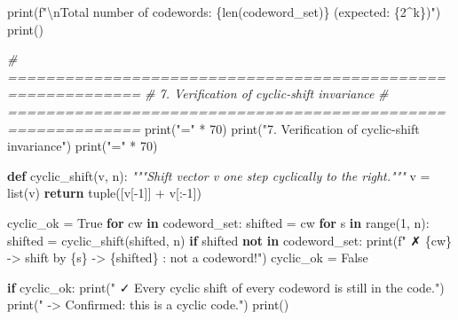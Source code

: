 \documentclass[
]{article}
\newenvironment{Shaded}{}{}
\newcommand{\BuiltInTok}[1]{\textcolor[rgb]{0.00,0.50,0.00}{#1}}
\newcommand{\CharTok}[1]{\textcolor[rgb]{0.25,0.44,0.63}{#1}}
\newcommand{\CommentTok}[1]{\textcolor[rgb]{0.38,0.63,0.69}{\textit{#1}}}
\newcommand{\ControlFlowTok}[1]{\textcolor[rgb]{0.00,0.44,0.13}{\textbf{#1}}}
\newcommand{\DecValTok}[1]{\textcolor[rgb]{0.25,0.63,0.44}{#1}}
\newcommand{\KeywordTok}[1]{\textcolor[rgb]{0.00,0.44,0.13}{\textbf{#1}}}
\newcommand{\NormalTok}[1]{#1}
\newcommand{\OperatorTok}[1]{\textcolor[rgb]{0.40,0.40,0.40}{#1}}
\newcommand{\SpecialCharTok}[1]{\textcolor[rgb]{0.25,0.44,0.63}{#1}}
\newcommand{\SpecialStringTok}[1]{\textcolor[rgb]{0.73,0.40,0.53}{#1}}
\newcommand{\StringTok}[1]{\textcolor[rgb]{0.25,0.44,0.63}{#1}}
\newcommand{\VariableTok}[1]{\textcolor[rgb]{0.10,0.09,0.49}{#1}}
\begin{document}
\begin{Shaded}
\begin{Highlighting}[]
\BuiltInTok{print}\NormalTok{(}\SpecialStringTok{f"}\CharTok{\textbackslash{}n}\SpecialStringTok{Total number of codewords: }\SpecialCharTok{\{}\BuiltInTok{len}\NormalTok{(codeword\_set)}\SpecialCharTok{\}}\SpecialStringTok{ (expected: }\SpecialCharTok{\{}\DecValTok{2}\OperatorTok{\^{}}\NormalTok{k}\SpecialCharTok{\}}\SpecialStringTok{)"}\NormalTok{)}
\BuiltInTok{print}\NormalTok{()}

\CommentTok{\# ============================================================}
\CommentTok{\# 7. Verification of cyclic{-}shift invariance}
\CommentTok{\# ============================================================}
\BuiltInTok{print}\NormalTok{(}\StringTok{"="} \OperatorTok{*} \DecValTok{70}\NormalTok{)}
\BuiltInTok{print}\NormalTok{(}\StringTok{"7. Verification of cyclic{-}shift invariance"}\NormalTok{)}
\BuiltInTok{print}\NormalTok{(}\StringTok{"="} \OperatorTok{*} \DecValTok{70}\NormalTok{)}

\KeywordTok{def}\NormalTok{ cyclic\_shift(v, n):}
    \CommentTok{"""Shift vector v one step cyclically to the right."""}
\NormalTok{    v }\OperatorTok{=} \BuiltInTok{list}\NormalTok{(v)}
    \ControlFlowTok{return} \BuiltInTok{tuple}\NormalTok{([v[}\OperatorTok{{-}}\DecValTok{1}\NormalTok{]] }\OperatorTok{+}\NormalTok{ v[:}\OperatorTok{{-}}\DecValTok{1}\NormalTok{])}

\NormalTok{cyclic\_ok }\OperatorTok{=} \VariableTok{True}
\ControlFlowTok{for}\NormalTok{ cw }\KeywordTok{in}\NormalTok{ codeword\_set:}
\NormalTok{    shifted }\OperatorTok{=}\NormalTok{ cw}
    \ControlFlowTok{for}\NormalTok{ s }\KeywordTok{in} \BuiltInTok{range}\NormalTok{(}\DecValTok{1}\NormalTok{, n):}
\NormalTok{        shifted }\OperatorTok{=}\NormalTok{ cyclic\_shift(shifted, n)}
        \ControlFlowTok{if}\NormalTok{ shifted }\KeywordTok{not} \KeywordTok{in}\NormalTok{ codeword\_set:}
            \BuiltInTok{print}\NormalTok{(}\SpecialStringTok{f"  ✗ }\SpecialCharTok{\{}\NormalTok{cw}\SpecialCharTok{\}}\SpecialStringTok{ {-}\textgreater{} shift by }\SpecialCharTok{\{}\NormalTok{s}\SpecialCharTok{\}}\SpecialStringTok{ {-}\textgreater{} }\SpecialCharTok{\{}\NormalTok{shifted}\SpecialCharTok{\}}\SpecialStringTok{ : not a codeword!"}\NormalTok{)}
\NormalTok{            cyclic\_ok }\OperatorTok{=} \VariableTok{False}

\ControlFlowTok{if}\NormalTok{ cyclic\_ok:}
    \BuiltInTok{print}\NormalTok{(}\StringTok{"  ✓ Every cyclic shift of every codeword is still in the code."}\NormalTok{)}
    \BuiltInTok{print}\NormalTok{(}\StringTok{"  {-}\textgreater{} Confirmed: this is a cyclic code."}\NormalTok{)}
\BuiltInTok{print}\NormalTok{()}


\end{Highlighting}
\end{Shaded}
\end{document}
